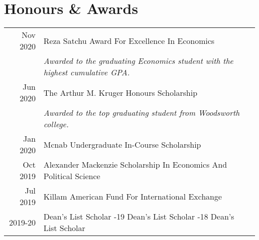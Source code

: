 \documentclass[letterpaper]{deedy-resume} %
\begin{document}
\begin{minipage}[t]{0.66\textwidth}
%
%



\section{Honours \& Awards} 

\begin{tabular}{rll}
Nov 2020	 & Reza Satchu Award For Excellence In Economics \\
			 & \emph{Awarded to the graduating Economics student with the highest cumulative GPA.} \\
Jun 2020	 & The Arthur M. Kruger Honours Scholarship \\
			 & \emph{Awarded to the top graduating student from Woodsworth college.}
\\
Jan 2020	 & Mcnab Undergraduate In-Course Scholarship \\
Oct 2019	 & Alexander Mackenzie Scholarship In Economics And Political Science\\
Jul 2019	 & Killam American Fund For International Exchange \\
2019-20		 & Dean's List Scholar \quad 
2018-19		  Dean's List Scholar \quad
2017-18		  Dean's List Scholar
\end{tabular}

\sectionspace %


%



\end{minipage} %
\end{document}
